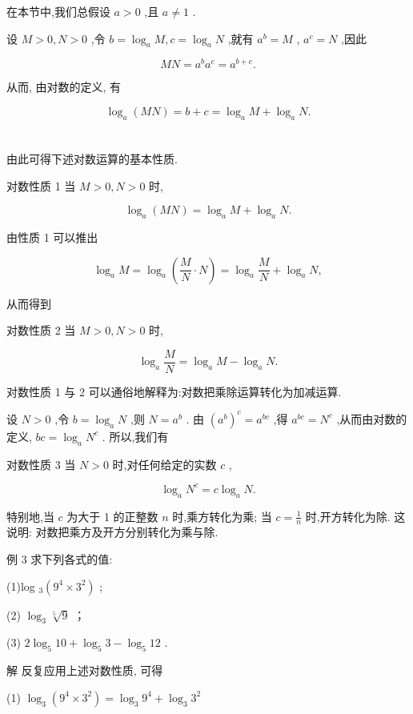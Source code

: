 \documentclass[10pt]{article}
\begin{document}
在本节中,我们总假设 \(a > 0\) ,且 \(a \neq  1\) .

设 \(M > 0,N > 0\) ,令 \(b = {\log }_{a}M,c = {\log }_{a}N\) ,就有 \({a}^{b} = M\) , \({a}^{c} = N\) ,因此

\[
{MN} = {a}^{b}{a}^{c} = {a}^{b + c}.
\]

从而, 由对数的定义, 有

\[
{\log }_{a}\left( {MN}\right)  = b + c = {\log }_{a}M + {\log }_{a}N.
\]

\section*{}



由此可得下述对数运算的基本性质.

对数性质 1 当 \(M > 0,N > 0\) 时,

\[
{\log }_{a}\left( {MN}\right)  = {\log }_{a}M + {\log }_{a}N.
\]

由性质 1 可以推出

\[
{\log }_{a}M = {\log }_{a}\left( {\frac{M}{N} \cdot  N}\right)  = {\log }_{a}\frac{M}{N} + {\log }_{a}N,
\]

从而得到

对数性质 2 当 \(M > 0,N > 0\) 时,

\[
{\log }_{a}\frac{M}{N} = {\log }_{a}M - {\log }_{a}N.
\]

对数性质 1 与 2 可以通俗地解释为:对数把乘除运算转化为加减运算.

设 \(N > 0\) ,令 \(b = {\log }_{a}N\) ,则 \(N = {a}^{b}\) . 由 \({\left( {a}^{b}\right) }^{c} = {a}^{bc}\) ,得 \({a}^{bc} = {N}^{c}\) ,从而由对数的定义, \({bc} = {\log }_{a}{N}^{c}\) . 所以,我们有

对数性质 3 当 \(N > 0\) 时,对任何给定的实数 \(c\) ,

\[
{\log }_{a}{N}^{c} = c{\log }_{a}N.
\]

特别地,当 \(c\) 为大于 1 的正整数 \(n\) 时,乘方转化为乘; 当 \(c = \frac{1}{n}\) 时,开方转化为除. 这说明: 对数把乘方及开方分别转化为乘与除.

例 3 求下列各式的值:

(1)log \({}_{3}\left( {{9}^{4} \times  {3}^{2}}\right)\) ;

(2) \({\log }_{3}\sqrt[5]{9}\) ；

(3) \(2{\log }_{5}{10} + {\log }_{5}3 - {\log }_{5}{12}\) .

解 反复应用上述对数性质, 可得

(1) \({\log }_{3}\left( {{9}^{4} \times  {3}^{2}}\right)  = {\log }_{3}{9}^{4} + {\log }_{3}{3}^{2}\)
\end{document}
